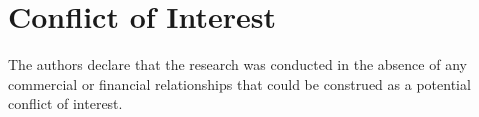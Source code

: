 \section{Conflict of Interest}

The authors declare that the research was conducted in the absence of any commercial or financial relationships that could be construed as a potential conflict of interest.
